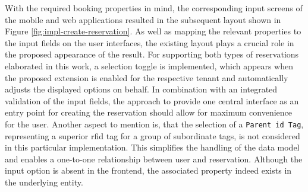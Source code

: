 \newpage

\noindent With the required booking properties in mind, the corresponding input screens of the mobile and web applications resulted in the subsequent layout shown in Figure \ref{fig:impl-create-reservation}. As well as mapping the relevant properties to the input fields on the user interfaces, the existing layout plays a crucial role in the proposed appearance of the result.
For supporting both types of reservations elaborated in this work, a selection toggle is implemented, which appears when the proposed extension is enabled for the respective tenant and automatically adjusts the displayed options on behalf.
In combination with an integrated validation of the input fields, the approach to provide one central interface as an entry point for creating the reservation should allow for maximum convenience for the user.
Another aspect to mention is, that the selection of a \texttt{Parent \acrshort{id} Tag}, representing a superior \acrshort{rfid} tag for a group of subordinate tags, is not considered in this particular implementation. This simplifies the handling of the data model and enables a one-to-one relationship between user and reservation.
Although the input option is absent in the frontend, the associated property indeed exists in the underlying entity.

